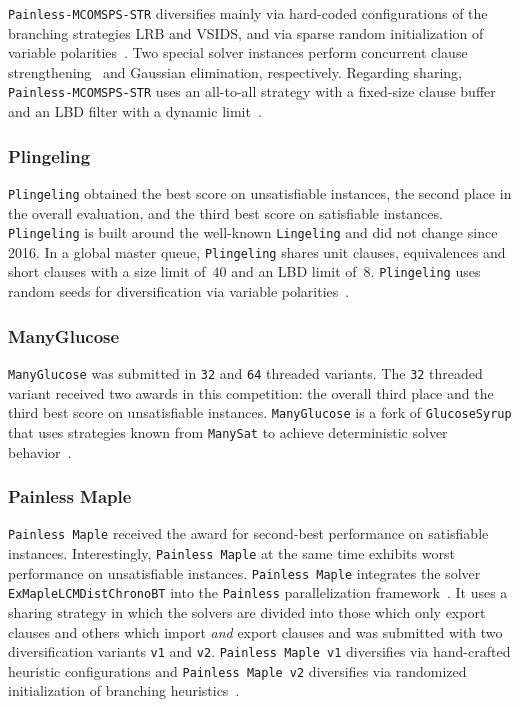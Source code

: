\documentclass{elsarticle}
\newcommand{\solver}[1]{\texttt{#1}}
\begin{document}
\solver{Painless-MCOMSPS-STR} diversifies mainly via hard-coded configurations of the branching strategies LRB and VSIDS, and via sparse random initialization of variable polarities~\cite{Balyo:2015:HordeSATs}. 
Two special solver instances perform concurrent clause strengthening~\cite{Wieringa:2013:CCS} and Gaussian elimination, respectively. 
Regarding sharing, \solver{Painless-MCOMSPS-STR} uses an all-to-all strategy with a fixed-size clause buffer and an LBD filter with a dynamic limit~\cite{SC2020}. 


\subsubsection{Plingeling} 

\solver{Plingeling} obtained the best score on unsatisfiable instances, the second place in the overall evaluation, and the third best score on satisfiable instances. 
\solver{Plingeling} is built around the well-known \solver{Lingeling} and did not change since 2016. 
In a global master queue, \solver{Plingeling} shares unit clauses, equivalences and short clauses with a size limit of~$40$ and an LBD limit of~$8$. 
\solver{Plingeling} uses random seeds for diversification via variable polarities~\cite{Biere:SC2020,Biere:2012:Lingeling}. 


\subsubsection{ManyGlucose}

\solver{ManyGlucose} was submitted in \solver{32} and \solver{64} threaded variants. 
The \solver{32} threaded variant received two awards in this competition: the overall third place and the third best score on unsatisfiable instances. 
\solver{ManyGlucose} is a fork of \solver{GlucoseSyrup} that uses strategies known from \solver{ManySat} to achieve deterministic solver behavior~\cite{Audemard:2018:GlucoseSyrup,Audemard:2014:LazyClauseExchange,Hamadi:2009:ManySat}. 


\subsubsection{Painless Maple} 

\solver{Painless Maple} received the award for second-best performance on satisfiable instances. 
Interestingly, \solver{Painless Maple}  
at the same time exhibits worst performance on unsatisfiable instances. 
\solver{Painless Maple} integrates the solver \solver{ExMapleLCMDistChronoBT} into the \solver{Painless} parallelization framework~\cite{Frioux:2017:Painless}. 
It uses a sharing strategy in which the solvers are divided into those which only export clauses and others which import \emph{and} export clauses and was submitted with two diversification variants \solver{v1} and \solver{v2}. 
\solver{Painless Maple v1} diversifies via hand-crafted heuristic configurations and \solver{Painless Maple v2} diversifies via randomized initialization of branching heuristics~\cite{SC2020}. 
\end{document}
